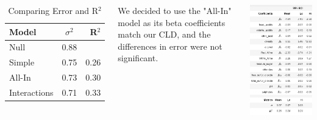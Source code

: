 \documentclass{beamer}
\begin{document}
\begin{frame}
\begin{columns}
		\vspace{-11pt}
		\begin{table}[h!]
			\begin{scriptsize}
			\begin{center}
				\caption{Comparing Error and R$^2$}
				\label{tab:Linear Regression Models}
				\begin{tabular}{l|c|r} %
					\textbf{Model} & \textbf{$\sigma$$^2$} & \textbf{R$^2$}\\
					\hline
					Null & 0.88 &  \\
					Simple & 0.75 & 0.26\\
					All-In & 0.73 & 0.30 \\
					Interactions & 0.71 & 0.33\\
				\end{tabular}
			\end{center}
		\end{scriptsize}
		\end{table}
						\begin{compactitem}[$\bullet$]
							\vspace{-10pt}
							\begin{small}
							\item We decided to use the "All-In" model as its beta coefficients match our CLD, and the differences in error were not significant.  
						\end{small}
				\end{compactitem}
			\begin{center}
				\vspace{-8pt}
				\includegraphics[width=.5\textwidth]{images/beta coefficients.png}
				\end{center}

	\end{columns}
	\end{frame}
\end{document}
